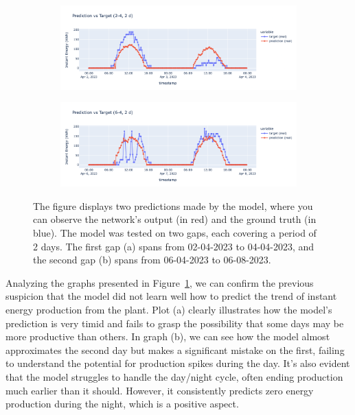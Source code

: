 \begin{figure}[H]
	\centering
	\begin{subfigure}{\textwidth}
		\centering
		\includegraphics[width=.8\textwidth]{chapters/3_models/imgs/ufnc/eval/ufcpred2-4.png}
		\caption{}
	\end{subfigure}
	\begin{subfigure}{\textwidth}
		\centering
		\includegraphics[width=.8\textwidth]{chapters/3_models/imgs/ufnc/eval/ufcpred6-4.png}
		\caption{}
	\end{subfigure}
	\caption{The figure displays two predictions made by the model, where you can observe the network's output (in red) and the ground truth (in blue). The model was tested on two gaps, each covering a period of 2 days. The first gap (a) spans from 02-04-2023 to 04-04-2023, and the second gap (b) spans from 06-04-2023 to 06-08-2023.}

	\label{fig:ufcnevalbelli}
\end{figure}

Analyzing the graphs presented in Figure~\ref{fig:ufcnevalbelli},
we can confirm the previous suspicion that the model did not learn well how
to predict the trend of instant energy production from the plant.
Plot (a) clearly illustrates how the model's prediction is very timid
and fails to grasp the possibility that some days may be more productive
than others.
In graph (b), we can see how the model almost approximates the second
day but makes a significant mistake on the first,
failing to understand the potential for production spikes during the day.
It's also evident that the model struggles to handle the
day/night cycle, often ending production much earlier than it should.
However, it consistently predicts zero energy production
during the night, which is a positive aspect.

